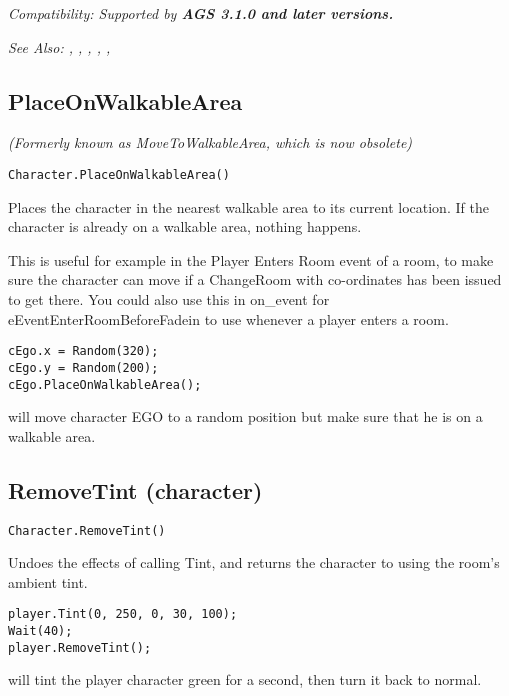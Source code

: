 \it{Compatibility:} Supported by \bf{AGS 3.1.0} and later versions.

\it{See Also:} ,
,
,
,
,


\subsection{PlaceOnWalkableArea}\label{Character.PlaceOnWalkableArea}%

\it{(Formerly known as MoveToWalkableArea, which is now obsolete)}

\begin{verbatim}
Character.PlaceOnWalkableArea()
\end{verbatim}
Places the character in the nearest walkable area to its current location.
If the character is already on a walkable area, nothing happens.

This is useful for example in the Player Enters Room event of a room, to
make sure the character can move if a ChangeRoom with co-ordinates has been issued to get there.
You could also use this in on_event for eEventEnterRoomBeforeFadein to use whenever a
player enters a room.

\begin{verbatim}
cEgo.x = Random(320);
cEgo.y = Random(200);
cEgo.PlaceOnWalkableArea();
\end{verbatim}
will move character EGO to a random position but make sure that he is on a walkable area.


\subsection{RemoveTint (character)}\label{Character.RemoveTint}%

\begin{verbatim}
Character.RemoveTint()
\end{verbatim}

Undoes the effects of calling Tint, and returns the character to using the room's ambient tint.

\begin{verbatim}
player.Tint(0, 250, 0, 30, 100);
Wait(40);
player.RemoveTint();
\end{verbatim}
will tint the player character green for a second, then turn it back to normal.

